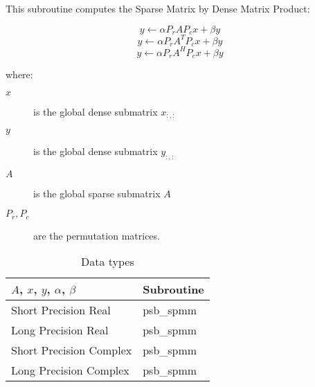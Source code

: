 %
%



This subroutine computes the Sparse Matrix by Dense Matrix Product:

\begin{equation}
y \leftarrow \alpha P_r A P_c x + \beta y
\label{eq:f90spmm_no_tra}
\end{equation}
\begin{equation}
y \leftarrow \alpha P_r A^T P_c x + \beta y
\label{eq:f90spmm_tra}
\end{equation}
\begin{equation}
y \leftarrow \alpha P_r A^H P_c x + \beta y
\label{eq:f90spmm_con}
\end{equation}

where:
\begin{description}
\item[$x$] is the global dense submatrix $x_{:, :}$
\item[$y$] is the global dense submatrix $y_{:, :}$
\item[$A$] is the global sparse submatrix $A$
\item[$P_r, P_c$] are the permutation matrices.
\end{description}

\begin{table}[h]
\begin{center}
\begin{tabular}{ll}
\hline
$A$, $x$, $y$, $\alpha$, $\beta$ & {\bf Subroutine}\\
\hline
Short Precision Real & psb\_spmm \\
Long Precision Real & psb\_spmm \\
Short Precision Complex & psb\_spmm \\
Long Precision Complex & psb\_spmm \\
\hline
\end{tabular}
\end{center}
\caption{Data types\label{tab:f90spmm}}
\end{table}


